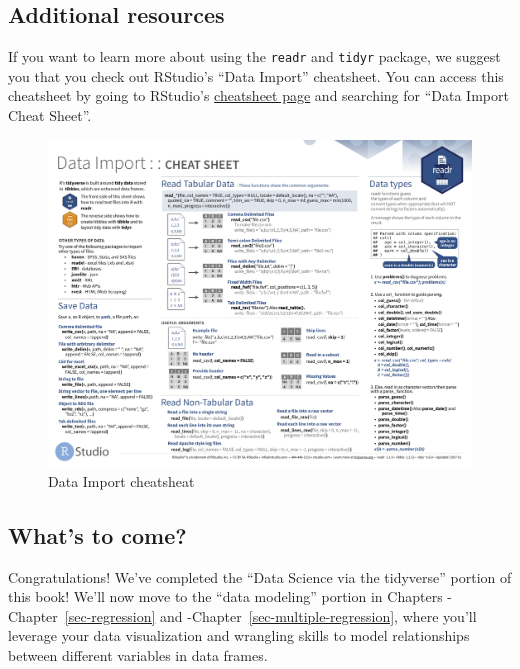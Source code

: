 \documentclass[
  letterpaper,
  DIV=11,
  numbers=noendperiod]{scrreprt}
\theoremstyle{definition}
\theoremstyle{remark}
\begin{document}
\hypertarget{additional-resources-3}{%
\subsection{Additional resources}\label{additional-resources-3}}

If you want to learn more about using the \texttt{readr} and
\texttt{tidyr} package, we suggest you that you check out RStudio's
``Data Import'' cheatsheet. You can access this cheatsheet by going to
RStudio's
\href{https://www.rstudio.com/resources/cheatsheets/}{cheatsheet page}
and searching for ``Data Import Cheat Sheet''.

\begin{figure}

{\centering \includegraphics{images/import_cheatsheet-1.png}

}

\caption{Data Import cheatsheat}

\end{figure}

\hypertarget{whats-to-come-1}{%
\subsection{What's to come?}\label{whats-to-come-1}}

Congratulations! We've completed the ``Data Science via the tidyverse''
portion of this book! We'll now move to the ``data modeling'' portion in
Chapters -Chapter~\ref{sec-regression} and
-Chapter~\ref{sec-multiple-regression}, where you'll leverage your data
visualization and wrangling skills to model relationships between
different variables in data frames.
\end{document}
